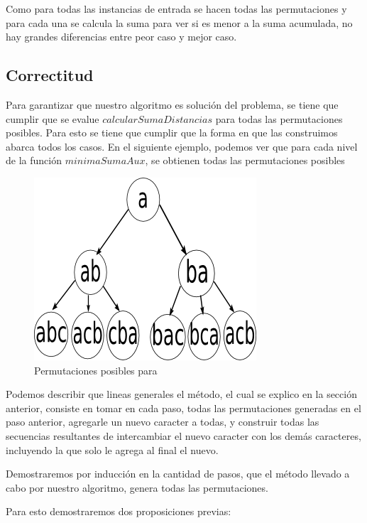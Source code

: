  Como para todas las instancias de entrada se hacen todas las permutaciones y para cada una se calcula la suma para ver si es menor a la suma acumulada, no hay grandes diferencias entre peor caso y mejor caso.
 
 
 



\subsection{Correctitud}

Para garantizar que nuestro algoritmo es solución del problema, se tiene que cumplir que se evalue $ calcularSumaDistancias $ para todas las permutaciones posibles. Para esto se tiene que cumplir que la forma en que las construimos abarca todos los casos. En el siguiente ejemplo, podemos ver que para cada nivel de la función $minimaSumaAux$, se obtienen todas las permutaciones posibles


\begin{figure}[H]
\centering
\includegraphics[scale=0.8]{imagenes/ej3Correctitud.png}
\caption{Permutaciones posibles para }
\label{256value}
\end{figure}



Podemos describir que lineas generales el método, el cual se explico en la sección anterior, consiste en tomar en cada paso, todas las permutaciones generadas en el paso anterior, agregarle un nuevo caracter a todas, y construir todas las secuencias resultantes de intercambiar el nuevo caracter con los demás caracteres, incluyendo la que solo le agrega al final el nuevo.

Demostraremos por inducción en la cantidad de pasos, que el método llevado a cabo por nuestro algoritmo, genera todas las permutaciones.

Para esto demostraremos dos proposiciones previas:

